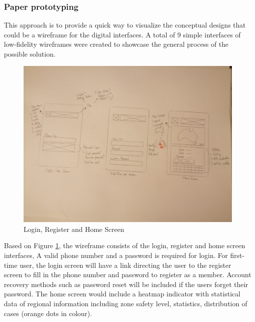     \subsubsection{Paper prototyping}
      \par This approach is to provide a quick way to visualize the conceptual designs that could be a wireframe for the digital interfaces. A total of 9 simple interfaces of low-fidelity wireframes were created to showcase the general process of the possible solution.
      \begin{figure}[H]
        \centering
        \includegraphics[width=18cm]{img/low-fidelity-prototype/sketch-1.png}
        \caption{Login, Register and Home Screen}
        \label{fig:prototype-01}
      \end{figure}
      
      \par Based on Figure \ref{fig:prototype-01}, the wireframe consists of the login, register and home screen interfaces, A valid phone number and a password is required for login. For first-time user, the login screen will have a link directing the user to the register screen to fill in the phone number and password to register as a member. Account recovery methods such as password reset will be included if the users forget their password. The home screen would include a heatmap indicator with statistical data of regional information including zone safety level, statistics, distribution of cases (orange dots in colour).
      
